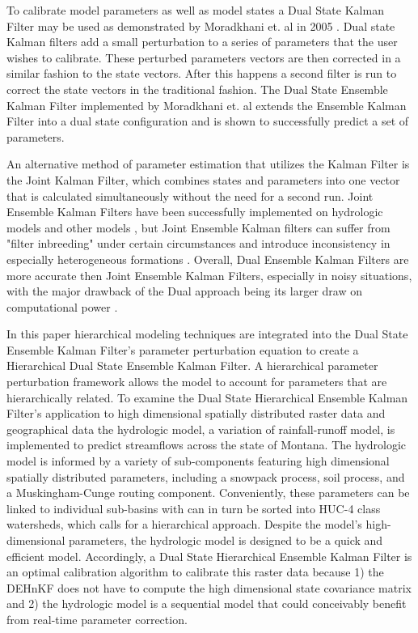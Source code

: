 	To calibrate model parameters as well as model states a Dual State Kalman Filter may be used as demonstrated by Moradkhani et. al in 2005 \cite{Moradkhani2005}. Dual state Kalman filters add a small perturbation to a series of parameters that the user wishes to calibrate. These perturbed parameters vectors are then corrected in a similar fashion to the state vectors. After this happens a second filter is run to correct the state vectors in the traditional fashion. The Dual State Ensemble Kalman Filter implemented by Moradkhani et. al\cite{Moradkhani2005} extends the Ensemble Kalman Filter into a dual state configuration and is shown to successfully predict a set of parameters.
	
	An alternative method of parameter estimation that utilizes the Kalman Filter is the Joint Kalman Filter, which combines states and parameters into one vector that is calculated simultaneously without the need for a second run. Joint Ensemble Kalman Filters have been successfully implemented on hydrologic models \cite{Vrugt2005} and other models \cite{Chen2008}, but Joint Ensemble Kalman filters can suffer from "filter inbreeding" under certain circumstances \cite{HendricksFranssen2008} and introduce inconsistency in especially heterogeneous formations \cite{Wen2006}. Overall, Dual Ensemble Kalman Filters are more accurate then Joint Ensemble Kalman Filters, especially in noisy situations, with the major drawback of the Dual approach being its larger draw on computational power \cite{Mariani2005}.
	
	In this paper hierarchical modeling techniques are integrated into the Dual State Ensemble Kalman Filter's parameter perturbation equation to create a Hierarchical Dual State Ensemble Kalman Filter. A hierarchical parameter perturbation framework allows the model to account for parameters that are hierarchically related. To examine the Dual State Hierarchical Ensemble Kalman Filter's application to high dimensional spatially distributed raster data and geographical data the hydrologic model, a variation of rainfall-runoff model, is implemented to predict streamflows across the state of Montana. The hydrologic model is informed by a variety of sub-components featuring high dimensional spatially distributed parameters, including a snowpack process, soil process, and a Muskingham-Cunge routing component. Conveniently, these parameters can be linked to individual sub-basins with can in turn be sorted into HUC-4 class watersheds, which calls for a hierarchical approach. Despite the model's high-dimensional parameters, the hydrologic model is designed to be a quick and efficient model. Accordingly, a Dual State Hierarchical Ensemble Kalman Filter is an optimal calibration algorithm to calibrate this raster data because 1) the DEHnKF does not have to compute the high dimensional state covariance matrix and 2) the hydrologic model is a sequential model that could conceivably benefit from real-time parameter correction.
	
